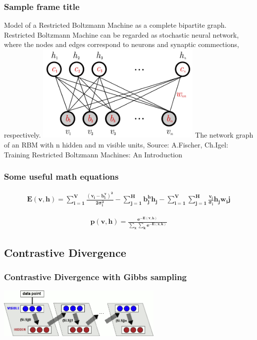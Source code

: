 \documentclass{beamer}
\begin{document}
  \begin{frame}
    \frametitle{Sample frame title}
    Model of a Restricted Boltzmann Machine as a complete bipartite graph. Restricted Boltzmann Machine can be regarded as stochastic neural network, where the nodes and edges correspond to neurons and synaptic commections, respectively.
    \includegraphics[width=8cm]{images/RBMnetworkGraph.png}
			{\TINY The network graph of an RBM with n hidden and m visible units, Source: A.Fischer, Ch.Igel: Training Restricted Boltzmann Machines: An Introduction}
    
  \end{frame}
  \begin{frame}
  \frametitle{Some useful math equations}
  \begin{align}
      \mathbf{E(v,h) = \sum_{i=1}^{V} \frac{(v_i - b_i^v)^2}{2\sigma_i^2} - \sum_{j=1}^{H} b_j^h h_j - \sum_{i=1}^{V} \sum_    {j=1}^{H} \frac{v_i}{\sigma_i} h_j w_ij}
  \end{align}

  \begin{align}
      \mathbf{p(v,h) = \frac{e^{-E(v,h)}}{\sum_x \sum_k e^{-E(x,k)}}}
  \end{align}
  \end{frame}
  
  \subsection{Contrastive Divergence} 
  \begin{frame}
  \frametitle{Contrastive Divergence with Gibbs sampling}
  \includegraphics[width=8cm]{images/trainRBM.png}
  \end{frame}
\end{document}
